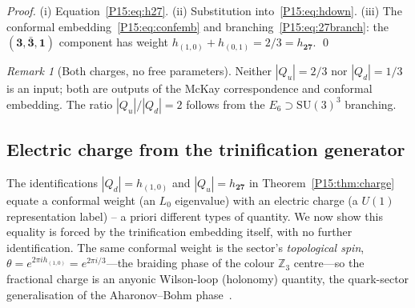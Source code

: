 \documentclass[11pt,a4paper]{article}
\theoremstyle{definition}\newtheorem{definition}[theorem]{Definition}
\theoremstyle{remark}
\newtheorem{remark}[theorem]{Remark}
\newcommand{\SU}{\mathrm{SU}}
\begin{document}
\begin{proof}
(i) Equation~\eqref{P15:eq:h27}.
(ii) Substitution into~\eqref{P15:eq:hdown}.
(iii) The conformal embedding~\eqref{P15:eq:confemb} and
branching~\eqref{P15:eq:27branch}: the $(\mathbf{3},\bar{\mathbf{3}},\mathbf{1})$
component has weight $h_{(1,0)}+h_{(0,1)}=2/3=h_{\mathbf{27}}$. \qed
\end{proof}

\begin{remark}[Both charges, no free parameters]
\label{P15:rem:both_charges_no_params}
Neither $|Q_u|=2/3$ nor $|Q_d|=1/3$ is an input; both are outputs
of the McKay correspondence and conformal embedding.
The ratio $|Q_u|/|Q_d|=2$ follows from the $E_6\supset\SU(3)^3$
branching.
\end{remark}

\subsection{Electric charge from the trinification generator}
\label{P15:sec:charge_generator}

The identifications $|Q_d|=h_{(1,0)}$ and $|Q_u|=h_{\mathbf{27}}$
in Theorem~\ref{P15:thm:charge} equate a conformal weight (an $L_0$
eigenvalue) with an electric charge (a $U(1)$ representation
label) -- a priori different types of quantity. We now show this
equality is forced by the trinification embedding itself, with no
further identification. The same conformal weight is the sector's
\emph{topological spin}, $\theta=e^{2\pi i h_{(1,0)}}=e^{2\pi i/3}$---the
braiding phase of the colour $\mathbb{Z}_3$ centre---so the fractional charge
is an anyonic Wilson-loop (holonomy) quantity, the quark-sector generalisation
of the Aharonov--Bohm phase~\cite{AharonovBohm1959}.
\end{document}
